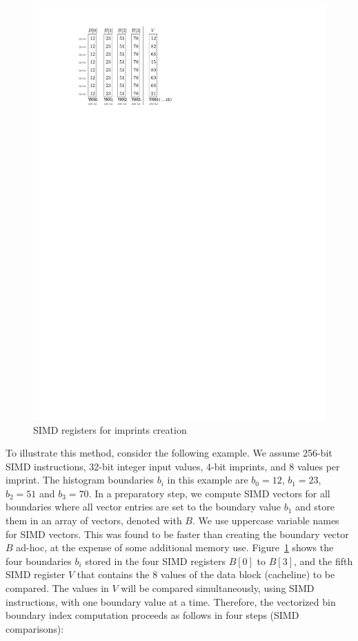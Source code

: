 \documentclass[sigconf]{acmart}
\begin{document}
\begin{figure}
\begin{center}
\includegraphics{simd_ex.pdf}
\end{center}
\caption{SIMD registers for imprints creation\label{fig:simd_ex}}
\end{figure}

To illustrate this method, consider the following example. We assume 256-bit SIMD instructions, 32-bit integer input values, 
4-bit imprints, and 8 values per imprint. The histogram boundaries $b_i$ in this example are $b_0=12$, $b_1=23$,
$b_2=51$ and $b_3=70$. In a preparatory step, we compute SIMD vectors for all boundaries where all vector entries are set to the 
boundary value $b_1$ and store them in an array of vectors, denoted with $B$. We use uppercase variable names for SIMD 
vectors. This was found to be faster than creating the boundary vector $B$ ad-hoc, at the expense of some additional 
memory use. Figure~\ref{fig:simd_ex} shows the four boundaries $b_i$ stored in the four SIMD registers $B[0]$ to
$B[3]$, and the fifth SIMD register $V$ that contains the 8 values of the data block (cacheline) to be compared.
The values in $V$ will be compared simultaneously, using SIMD instructions, with one boundary value at a time.
Therefore, the vectorized bin boundary index computation proceeds as follows in four steps (SIMD comparisons):
\end{document}
